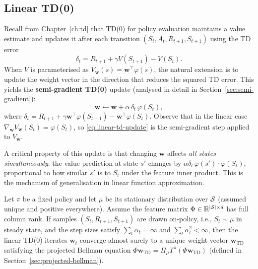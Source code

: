 \subsection{Linear TD(0)}
\label{subsec:linear-td}

Recall from Chapter~\ref{ch:td} that TD(0) for policy evaluation maintains a value estimate and
updates it after each transition $(S_t, A_t, R_{t+1}, S_{t+1})$ using the TD error
\[
\delta_t = R_{t+1} + \gamma V(S_{t+1}) - V(S_t).
\]
When $V$ is parameterised as $V_\mathbf{w}(s) = \mathbf{w}^\top \varphi(s)$, the natural
extension is to update the weight vector in the direction that reduces the squared TD error.  This
yields the \textbf{semi-gradient TD(0)} update (analysed in detail in
Section~\ref{sec:semi-gradient}):
\begin{equation}
\label{eq:linear-td-update}
\mathbf{w} \leftarrow \mathbf{w} + \alpha\, \delta_t\, \varphi(S_t),
\end{equation}
where $\delta_t = R_{t+1} + \gamma \mathbf{w}^\top \varphi(S_{t+1}) - \mathbf{w}^\top \varphi(S_t)$.
Observe that in the linear case $\nabla_\mathbf{w} V_\mathbf{w}(S_t) = \varphi(S_t)$, so
\eqref{eq:linear-td-update} is the semi-gradient step applied to $V_\mathbf{w}$.

A critical property of this update is that changing $\mathbf{w}$ affects \emph{all states
simultaneously}: the value prediction at state $s'$ changes by $\alpha \delta_t \, \varphi(s')
\cdot \varphi(S_t)$, proportional to how similar $s'$ is to $S_t$ under the feature inner product.
This is the mechanism of generalisation in linear function approximation.

\begin{theorem}
\label{thm:linear-td-convergence}
Let $\pi$ be a fixed policy and let $\mu$ be its stationary distribution over $\mathcal{S}$ (assumed
unique and positive everywhere).  Assume the feature matrix $\Phi \in \mathbb{R}^{|\mathcal{S}| \times d}$ has
full column rank.  If samples $(S_t, R_{t+1}, S_{t+1})$ are drawn on-policy, i.e., $S_t \sim \mu$
in steady state, and the step sizes satisfy $\sum_t \alpha_t = \infty$ and
$\sum_t \alpha_t^2 < \infty$, then the linear TD(0) iterates $\mathbf{w}_t$ converge
almost surely to a unique weight vector $\mathbf{w}_{\mathrm{TD}}$ satisfying the projected
Bellman equation $\Phi \mathbf{w}_{\mathrm{TD}} = \Pi_\mu T^\pi (\Phi \mathbf{w}_{\mathrm{TD}})$
(defined in Section~\ref{sec:projected-bellman}).
\end{theorem}

